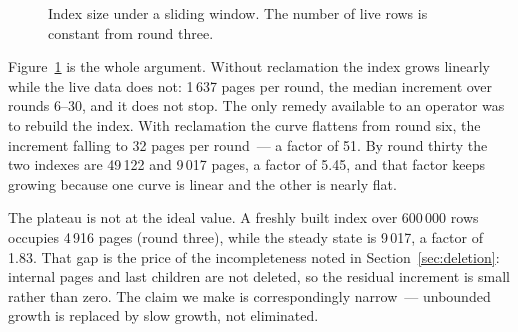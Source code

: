 \begin{figure}[t]
\centering
{}
\caption{Index size under a sliding window. The number of live rows is constant
from round three.}
\label{fig:reuse}
\end{figure}

Figure~\ref{fig:reuse} is the whole argument. Without reclamation the index
grows linearly while the live data does not: 1\,637 pages per round, the median
increment over rounds 6--30, and it does not stop. The only remedy available to
an operator was to rebuild the index. With reclamation the curve flattens from
round six, the increment falling to 32 pages per round~--- a factor of 51. By
round thirty the two indexes are 49\,122 and 9\,017 pages, a factor of 5.45, and
that factor keeps growing because one curve is linear and the other is nearly
flat.

The plateau is not at the ideal value. A freshly built index over 600\,000 rows
occupies 4\,916 pages (round three), while the steady state is 9\,017, a factor
of 1.83. That gap is the price of the incompleteness noted in
Section~\ref{sec:deletion}: internal pages and last children are not deleted, so
the residual increment is small rather than zero. The claim we make is
correspondingly narrow~--- unbounded growth is replaced by slow growth, not
eliminated.

